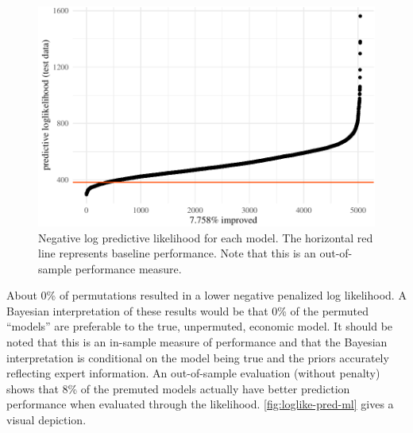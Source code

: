 \documentclass[11pt]{article}
\begin{document}
\begin{figure}[t]

{\centering \includegraphics{gfx/loglike-pred-ml-1} 

}

\caption{Negative log predictive likelihood for each model. The horizontal red line represents baseline performance. Note that this is an out-of-sample performance measure.}\label{fig:loglike-pred-ml}
\end{figure}

About 0\% of permutations resulted in a lower negative penalized log
likelihood. A Bayesian interpretation of these results would be that 0\%
of the permuted ``models'' are preferable to the true, unpermuted,
economic model. It should be noted that this is an in-sample measure of
performance and that the Bayesian interpretation is conditional on the
model being true and the priors accurately reflecting expert
information. An out-of-sample evaluation (without penalty) shows that
8\% of the premuted models actually have better prediction performance
when evaluated through the likelihood. \autoref{fig:loglike-pred-ml}
gives a visual depiction.

\begin{table}[t]

\caption{\label{tab:best-results}Series MSEs for SW and top models.}
\centering
{}
\end{table}
\end{document}
